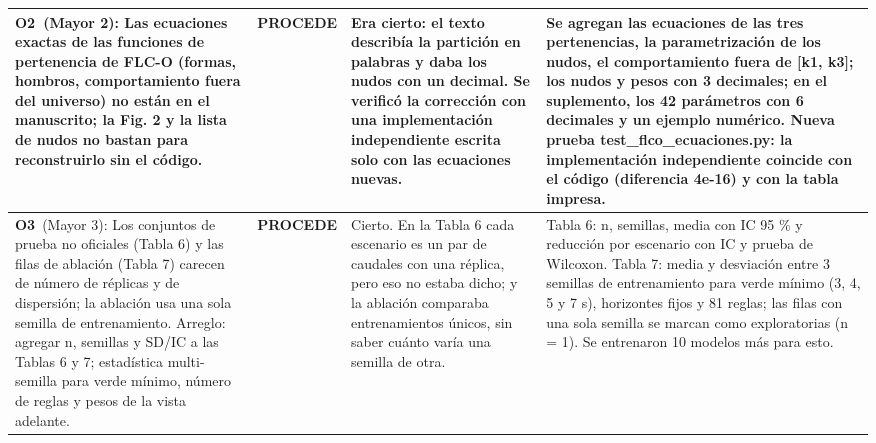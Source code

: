 \begin{longtable}{@{}p{7.4cm}p{2.1cm}p{8.4cm}p{7.3cm}@{}}
\textbf{O2}\ (Mayor 2): Las ecuaciones exactas de las funciones de pertenencia de FLC-O (formas, hombros, comportamiento fuera del universo) no están en el manuscrito; la Fig. 2 y la lista de nudos no bastan para reconstruirlo sin el código.\par\smallskip{\itshape Ubicaci\'on citada: Fig. 2; Tabla 3; Justificación Sec. 7; C4, C5, C9; Parte 4B ítem 12} & \cellcolor{okverde}\textbf{PROCEDE} & Era cierto: el texto describía la partición en palabras y daba los nudos con un decimal. Se verificó la corrección con una implementación independiente escrita solo con las ecuaciones nuevas. & Se agregan las ecuaciones de las tres pertenencias, la parametrización de los nudos, el comportamiento fuera de [k1, k3]; los nudos y pesos con 3 decimales; en el suplemento, los 42 parámetros con 6 decimales y un ejemplo numérico. Nueva prueba test\_flco\_ecuaciones.py: la implementación independiente coincide con el código (diferencia 4e-16) y con la tabla impresa.\par\smallskip{\itshape Queda en: Sec. VI-B (p. 5); Ec. (6) (p. 5); Fig. 3 (p. 7); Tabla 2 (p. 6); Sec. IX del suplemento (p. 2); Tabla S7 del suplemento (p. 5); Tabla S8 del suplemento (p. 5)} \\
\midrule
\textbf{O3}\ (Mayor 3): Los conjuntos de prueba no oficiales (Tabla 6) y las filas de ablación (Tabla 7) carecen de número de réplicas y de dispersión; la ablación usa una sola semilla de entrenamiento. Arreglo: agregar n, semillas y SD/IC a las Tablas 6 y 7; estadística multi-semilla para verde mínimo, número de reglas y pesos de la vista adelante.\par\smallskip{\itshape Ubicaci\'on citada: Tablas 6 y 7; C5, C6; Sec. 7} & \cellcolor{okverde}\textbf{PROCEDE} & Cierto. En la Tabla 6 cada escenario es un par de caudales con una réplica, pero eso no estaba dicho; y la ablación comparaba entrenamientos únicos, sin saber cuánto varía una semilla de otra. & Tabla 6: n, semillas, media con IC 95 \% y reducción por escenario con IC y prueba de Wilcoxon. Tabla 7: media y desviación entre 3 semillas de entrenamiento para verde mínimo (3, 4, 5 y 7 s), horizontes fijos y 81 reglas; las filas con una sola semilla se marcan como exploratorias (n = 1). Se entrenaron 10 modelos más para esto.\par\smallskip{\itshape Queda en: Sec. VIII-B (p. 8); Tabla 6 (p. 11); Sec. VIII-C (p. 8); Tabla 7 (p. 11); Tabla S6 del suplemento (p. 4)} \\
\midrule

\end{longtable}
